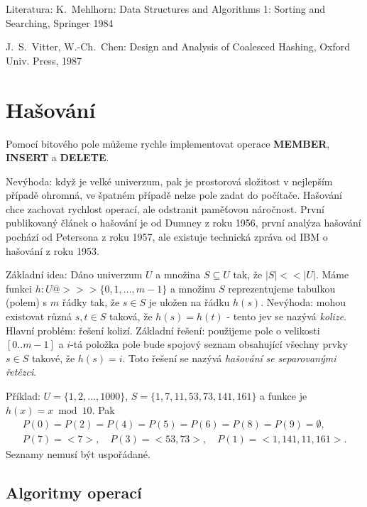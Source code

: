 \documentclass[a4paper,12pt]{article}
\begin{document}
Literatura:\newline 
K.~Mehlhorn: Data Structures and Algorithms 1: Sorting 
and Searching, Springer 1984\newline 

J.~S.~Vitter, W.-Ch.~Chen: Design and Analysis of 
Coalesced Hashing, Oxford Univ. Press, 1987

\section{Hašování}

Pomocí bitového pole můžeme rychle 
implementovat operace {\bf MEMBER}, {\bf INSERT} a {\bf DELETE}. 

Nevýhoda: když je velké univerzum, pak je prostorová 
složitost v nejlepším případě ohrom\-ná, ve špatném 
případě nelze pole zadat do počítače.\newline 
Hašování chce zachovat rychlost operací, ale odstranit 
paměťo\-vou náročnost. První publikovaný článek o 
hašování je od Dumney z roku 1956, první analýza hašování 
pochází od Petersona z roku 1957, ale existuje technická  
zpráva od IBM o hašování z roku 1953.

Základní idea: Dáno univerzum $U$ a množina 
$S\subseteq U$ tak, že $|S|<<|U|$. Máme funkci 
$h:U@>>>\{0,1,\dots,m-1\}$ a množinu $S$ reprezentujeme 
tabulkou (polem) s $m$ řádky tak, že $s\in S$ je uložen na 
řádku $h(s)$.\newline 
Nevýhoda: mohou existovat různá $s,t\in S$ taková, 
že $h(s)=h(t)$ - tento jev se nazývá \emph{kolize}.\newline 
Hlavní problém: řešení kolizí.\newline 
Základní řešení: použijeme pole o velikosti $[
0..m-1]$ a 
$i$-tá položka pole bude spojový seznam obsahující 
všechny prvky $s\in S$ takové, že $h(s)=i$. Toto řešení se 
nazývá \emph{hašování} \emph{se} \emph{separovanými} 
\emph{řetězci}.

Příklad: $U=\{1,2,\dots,1000\}$, $S=\{1,7,11,53,
73,141,161\}$ a 
funkce je $h(x)=x\bmod10$. Pak 
\begin{gather*} P(0)=P(2)=P(4)=P(5)=P(6)=P(8)=P(9)=\emptyset ,\\
P(7)=<7>,\quad P(3)=<53,73>,\quad P(1)=<1,141,11,161>.\end{gather*}
Seznamy nemusí být uspořádané.  

\subsection{
Algoritmy operací
}
\end{document}
